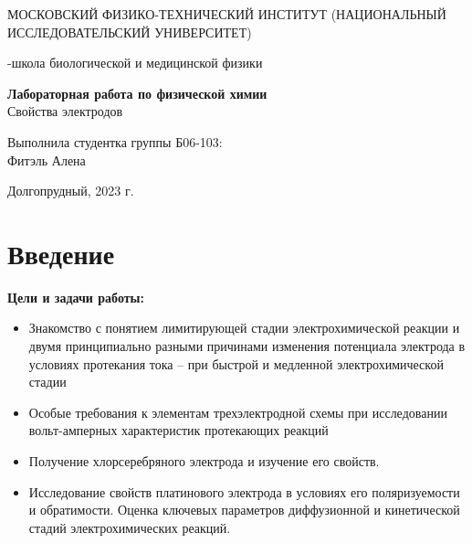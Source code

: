 \documentclass[a4paper,12pt]{article}
\begin{document}
\def\figurename{Рисунок}
\begin{titlepage}
\begin{center}
    {\large МОСКОВСКИЙ ФИЗИКО-ТЕХНИЧЕСКИЙ ИНСТИТУТ (НАЦИОНАЛЬНЫЙ ИССЛЕДОВАТЕЛЬСКИЙ УНИВЕРСИТЕТ)}
\end{center}
\begin{center}
    {-школа биологической и медицинской физики}
\end{center}

\vspace{1cm}
{\huge
\begin{center}
    {\bf Лабораторная работа по физической химии}\\
    \vspace{0.5cm}
    Свойства электродов
\end{center}
}

\vspace{4cm}
\begin{flushright}
{\LARGE Выполнила студентка группы Б06-103:\\ Фитэль Алена \\}

\end{flushright}
\vspace{9cm}
\begin{center}
    Долгопрудный, 2023 г.
\end{center}
\end{titlepage}
\newpage
\section{Введение}


\textbf{Цели и задачи работы:}
\begin{itemize}
\item Знакомство с понятием лимитирующей стадии электрохимической реакции и
двумя принципиально разными причинами изменения потенциала электрода в
условиях протекания тока – при быстрой и медленной электрохимической стадии
\item Особые требования к элементам трехэлектродной схемы при исследовании
вольт-амперных характеристик протекающих реакций
\item  Получение хлорсеребряного электрода и изучение его свойств.
\item  Исследование свойств платинового электрода в условиях его поляризуемости и
обратимости. Оценка ключевых параметров диффузионной и кинетической
стадий электрохимических реакций. 
\end{itemize}
\end{document}
